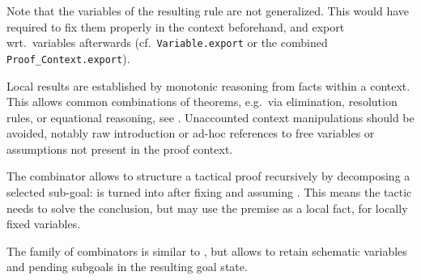 \begin{isabellebody}
{}%
\endisatagML
{\isafoldML}%
%
\isadelimML
%
\endisadelimML
%
\begin{isamarkuptext}%
Note that the variables of the resulting rule are not
  generalized.  This would have required to fix them properly in the
  context beforehand, and export wrt.\ variables afterwards (cf.\ \verb|Variable.export| or the combined \verb|Proof_Context.export|).%
\end{isamarkuptext}%
\isamarkuptrue%
%
\isamarkuptrue%
%
\begin{isamarkuptext}%
Local results are established by monotonic reasoning from facts
  within a context.  This allows common combinations of theorems,
  e.g.\ via  elimination, resolution rules, or equational
  reasoning, see .  Unaccounted context manipulations
  should be avoided, notably raw  introduction or ad-hoc
  references to free variables or assumptions not present in the proof
  context.

  \medskip The  combinator allows to structure a
  tactical proof recursively by decomposing a selected sub-goal:
   is turned into 
  after fixing  and assuming .  This means
  the tactic needs to solve the conclusion, but may use the premise as
  a local fact, for locally fixed variables.

  The family of  combinators is similar to , but allows to retain schematic variables and pending
  subgoals in the resulting goal state.


\end{isamarkuptext}
\end{isabellebody}
